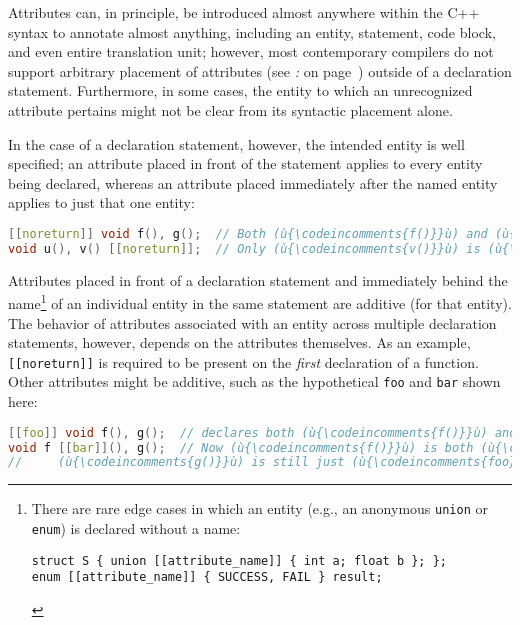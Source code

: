 Attributes can, in principle, be introduced almost anywhere within the
C++ syntax to annotate almost anything, including an entity,
statement, code block, and even entire translation
unit; however, most contemporary compilers do not support arbitrary
placement of attributes (see {\it{}:} {\it{}} on page~\pageref{probing-where-attributes-are-permitted-in-the-compiler’s-c++-grammar}) outside of a
declaration statement. Furthermore, in some cases, the entity to
which an unrecognized attribute pertains might not be clear from its
syntactic placement alone.

In the case of a declaration statement, however, the intended entity is
well specified; an attribute placed in front of the statement applies to
every entity being declared, whereas an attribute placed immediately
after the named entity applies to just that one entity:

\begin{lstlisting}[language=C++]
[[noreturn]] void f(), g();  // Both (ù{\codeincomments{f()}}ù) and (ù{\codeincomments{g()}}ù) are (ù{\codeincomments{noreturn}}ù).
void u(), v() [[noreturn]];  // Only (ù{\codeincomments{v()}}ù) is (ù{\codeincomments{noreturn}}ù).
\end{lstlisting}

\noindent Attributes placed in front of a declaration statement and immediately
behind the name{\cprotect\footnote{There are rare edge cases in which an
entity (e.g., an anonymous \texttt{union} or \texttt{enum}) is
declared without a name:

\begin{lstlisting}[style=footcode]
struct S { union [[attribute_name]] { int a; float b }; };
enum [[attribute_name]] { SUCCESS, FAIL } result;
\end{lstlisting} \vspace*{-1ex}
}} of an individual entity in the same statement are additive (for
that entity). The behavior of attributes associated with an entity
across multiple declaration statements, however, depends on the
attributes themselves. As an example, \texttt{[[noreturn]]} is required
to be present on the \emph{first} declaration of a function. Other
attributes might be additive, such as the hypothetical \texttt{foo} and
\texttt{bar} shown here:

\begin{lstlisting}[language=C++]
[[foo]] void f(), g();  // declares both (ù{\codeincomments{f()}}ù) and (ù{\codeincomments{g()}}ù) to be (ù{\codeincomments{foo}}ù)
void f [[bar]](), g();  // Now (ù{\codeincomments{f()}}ù) is both (ù{\codeincomments{foo}}ù) and (ù{\codeincomments{bar}}ù) while
//     (ù{\codeincomments{g()}}ù) is still just (ù{\codeincomments{foo}}ù).
\end{lstlisting}
\pagebreak%


